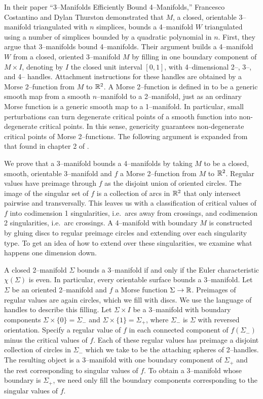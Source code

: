 \label{sec:bounding}

In their paper ``3--Manifolds Efficiently Bound 4--Manifolds,'' Francesco Costantino and Dylan Thurston demonstrated that $M$, a closed, orientable 3--manifold triangulated with $n$ simplices, bounds a 4--manifold $W$ triangulated using a number of simplices bounded by a quadratic polynomial in $n$.
First, they argue that 3--manifolds bound 4--manifolds.
Their argument builds a 4--manifold $W$ from a closed, oriented 3--manifold $M$ by filling in one boundary component of $M\times I$, denoting by $I$ the closed unit interval $[0,1]$, with 4--dimensional 2--, 3--, and 4-- handles.
Attachment instructions for these handles are obtained by a Morse 2--function from $M$ to $\mathbb{R}^2$.
A Morse 2--function is defined in \cite{GayKirby14} to be a generic smooth map from a smooth $n$--manifold to a 2--manifold, just as an ordinary Morse function is a generic smooth map to a 1--manifold.
In particular, small perturbations can turn degenerate critical points of a smooth function into non-degenerate critical points.
In this sense, genericity guarantees non-degenerate critical points of Morse 2--functions.
The following argument is expanded from that found in chapter 2 of \cite{CostThur08}.

We prove that a 3--manifold bounds a 4--manifolds by taking $M$ to be a closed, smooth, orientable 3--manifold and $f$ a Morse 2--function from $M$ to $\mathbb{R}^2$.
Regular values have preimage through $f$ as the disjoint union of oriented circles.
The image of the singular set of $f$ is a collection of arcs in $\mathbb{R}^2$ that only intersect pairwise and transversally.
This leaves us with a classification of critical values of $f$ into codimension 1 singularities, i.e.\ arcs away from crossings, and codimension 2 singularities, i.e.\ arc crossings.
A 4--manifold with boundary $M$ is constructed by gluing discs to regular preimage circles and extending over each singularity type.
To get an idea of how to extend over these singularities, we examine what happens one dimension down.

A closed 2--manifold $\Sigma$ bounds a 3--manifold if and only if the Euler characteristic $\chi(\Sigma)$ is even.
In particular, every orientable surface bounds a 3--manifold.
Let $\Sigma$ be an oriented 2--manifold and $f$ a Morse function $\Sigma\to\mathbb{R}$.
Preimages of regular values are again circles, which we fill with discs.
We use the language of handles to describe this filling.
Let $\Sigma\times I$ be a 3--manifold with boundary components $\Sigma\times\{0\}=\Sigma_-$ and $\Sigma\times\{1\}=\Sigma_+$, where $\Sigma_-$ is $\Sigma$ with reversed orientation.
Specify a regular value of $f$ in each connected component of $f(\Sigma_-)$ minus the critical values of $f$.
Each of these regular values has preimage a disjoint collection of circles in $\Sigma_-$ which we take to be the attaching spheres of 2--handles. 
The resulting object is a 3--manifold with one boundary component of $\Sigma_+$ and the rest corresponding to singular values of $f$.
To obtain a 3--manifold whose boundary is $\Sigma_+$, we need only fill the boundary components corresponding to the singular values of $f$.

